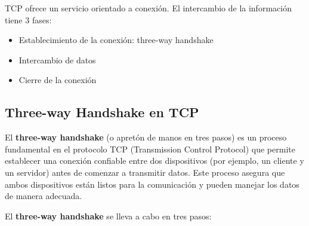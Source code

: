 \documentclass[a4paper,12pt]{article}
\begin{document}
TCP ofrece un servicio orientado a conexión. El intercambio de la información tiene 3 fases:
\begin{itemize}
    \item Establecimiento de la conexión: three-way handshake
    \item Intercambio de datos
    \item Cierre de la conexión
\end{itemize}

\subsection*{Three-way Handshake en TCP}

El \textbf{three-way handshake} (o apretón de manos en tres pasos) es un proceso fundamental en el protocolo TCP (Transmission Control Protocol) que permite establecer una conexión confiable entre dos dispositivos (por ejemplo, un cliente y un servidor) antes de comenzar a transmitir datos. Este proceso asegura que ambos dispositivos están listos para la comunicación y pueden manejar los datos de manera adecuada.

El \textbf{three-way handshake} se lleva a cabo en tres pasos:
\end{document}

